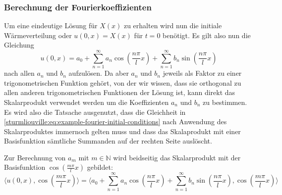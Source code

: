 \subsubsection{Berechnung der Fourierkoeffizienten}

%
%

Um eine eindeutige Lösung für $X(x)$ zu erhalten wird nun die initiale
Wärmeverteilung oder $u(0, x) = X(x)$ für $t = 0$ benötigt.
Es gilt also nun die Gleichung
\begin{equation}
    \label{sturmliouville:eq:example-fourier-initial-conditions}
    u(0, x)
    =
    a_0
    +
    \sum_{n = 1}^{\infty} a_n\cos\left(\frac{n\pi}{l}x\right)
    +
    \sum_{n = 1}^{\infty} b_n\sin\left(\frac{n\pi}{l}x\right)
\end{equation}
nach allen $a_n$ und $b_n$ aufzulösen.
Da aber $a_n$ und $b_n$ jeweils als Faktor zu einer trigonometrischen Funktion
gehört, von der wir wissen, dass sie orthogonal zu allen anderen
trigonometrischen Funktionen der Lösung ist, kann direkt das Skalarprodukt
verwendet werden um die Koeffizienten $a_n$ und $b_n$ zu bestimmen.
Es wird also die Tatsache ausgenutzt, dass die Gleichheit in
\eqref{sturmliouville:eq:example-fourier-initial-conditions} nach Anwendung des
Skalarproduktes immernoch gelten muss und dass das Skalaprodukt mit einer
Basisfunktion sämtliche Summanden auf der rechten Seite auslöscht.

Zur Berechnung von $a_m$ mit $ m \in \mathbb{N} $ wird beidseitig das
Skalarprodukt mit der Basisfunktion $ \cos\left(\frac{m \pi}{l}x\right)$
gebildet:
\begin{equation}
    \label{sturmliouville:eq:dot-product-cosine}
    \biggl\langle u(0, x), \cos\left(\frac{m \pi}{l}x\right) \biggr\rangle
    =
    \biggl\langle a_0
    +
    \sum_{n = 1}^{\infty} a_n\cos\left(\frac{n\pi}{l}x\right)
    +
    \sum_{n = 1}^{\infty} b_n\sin\left(\frac{n\pi}{l}x\right),
    \cos\left(\frac{m \pi}{l}x\right)\biggr\rangle
\end{equation}

